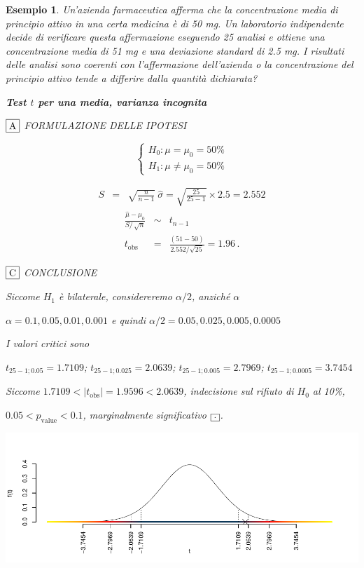 \documentclass[
  11pt,
]{book}
\theoremstyle{mytheoremstyle}
\theoremstyle{mydefstyle}
\newtheorem{example}{{Esempio}}[section]
\begin{document}
\begin{example}
Un'azienda farmaceutica afferma che la concentrazione media di principio attivo
in una certa medicina è di 50 mg. Un laboratorio indipendente decide di
verificare questa affermazione eseguendo 25 analisi e ottiene una concentrazione
media di 51 mg e una deviazione standard di 2.5 mg.
I risultati delle analisi sono coerenti con l'affermazione dell'azienda o la
concentrazione del principio attivo tende a differire dalla quantità dichiarata?

\textbf{Test \(t\) per una media, varianza incognita}

\(\fbox{A}\) FORMULAZIONE DELLE IPOTESI

\[\begin{cases}
   H_0: \mu = \mu_0=50\% \\
   H_1: \mu \neq \mu_0=50\% 
   \end{cases}\]

\begin{eqnarray*}
   S    &=& \sqrt{\frac{n} {n-1}}\ \widehat{\sigma} 
   =  \sqrt{\frac{ 25 } { 25 -1}} \times  2.5  =  2.552 
   \end{eqnarray*}
\begin{eqnarray*}
   \frac{\hat\mu - \mu_{0}} {S/\,\sqrt{n}}&\sim&t_{n-1}\\
   t_{\text{obs}}
   &=& \frac{ ( 51 -  50 )} { 2.552 /\sqrt{ 25 }}
   =   1.96 \, .
   \end{eqnarray*}

\(\fbox{C}\) CONCLUSIONE

Siccome \(H_1\) è bilaterale, considereremo \(\alpha/2\),
anziché \(\alpha\)

\(\alpha=0.1, 0.05, 0.01, 0.001\) e quindi \(\alpha/2=0.05, 0.025, 0.005, 0.0005\)

I valori critici sono

\(t_{25-1;0.05}=1.7109\); \(t_{25-1;0.025}=2.0639\); \(t_{25-1;0.005}=2.7969\); \(t_{25-1;0.0005}=3.7454\)

Siccome \(1.7109<|t_\text{obs}|=1.9596<2.0639\), indecisione sul rifiuto di \(H_0\) al 10\%,

\(0.05<p_\text{value}<0.1\), \emph{marginalmente significativo} \(\fbox{.}\).

\begin{center}\includegraphics{Appunti_di_Statistica_2025_files/figure-latex/15-test-mu-pi-8-1} \end{center}


\end{example}
\end{document}

